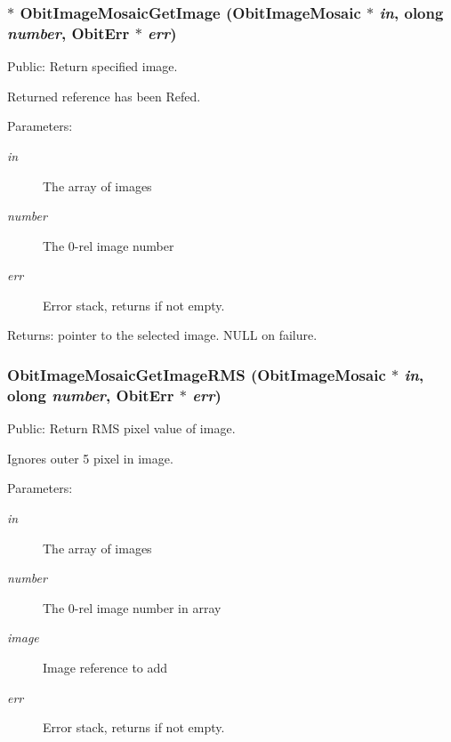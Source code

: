 \subsubsection{$\ast$ Obit\-Image\-Mosaic\-Get\-Image ({\bf Obit\-Image\-Mosaic} $\ast$ {\em in}, {\bf olong} {\em number}, {\bf Obit\-Err} $\ast$ {\em err})}\label{ObitImageMosaic_8h_a11}


Public: Return specified image. 

Returned reference has been Refed. \begin{Desc}
\item[Parameters:]
\begin{description}
\item[{\em in}]The array of images \item[{\em number}]The 0-rel image number \item[{\em err}]Error stack, returns if not empty. \end{description}
\end{Desc}
\begin{Desc}
\item[Returns:]pointer to the selected image. NULL on failure. \end{Desc}
\subsubsection{ Obit\-Image\-Mosaic\-Get\-Image\-RMS ({\bf Obit\-Image\-Mosaic} $\ast$ {\em in}, {\bf olong} {\em number}, {\bf Obit\-Err} $\ast$ {\em err})}\label{ObitImageMosaic_8h_a13}


Public: Return RMS pixel value of image. 

Ignores outer 5 pixel in image. \begin{Desc}
\item[Parameters:]
\begin{description}
\item[{\em in}]The array of images \item[{\em number}]The 0-rel image number in array \item[{\em image}]Image reference to add \item[{\em err}]Error stack, returns if not empty. \end{description}
\end{Desc}
